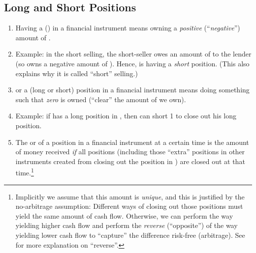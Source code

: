 \subsection{Long and Short Positions}
\label{subsect:long-short-pos}
\begin{enumerate}
\item \label{it:long-short-def}
Having a  () in a financial
instrument  means owning a \emph{positive} (``\emph{negative}'')
amount of .


\item Example: in the short selling, the short-seller  owes an amount of
 to the lender  (so  owns a
negative amount of ). Hence,  is having a
\emph{short} position.  (This also explains why it is called ``short''
selling.)

\item {} or  a (long or short) position in a
financial instrument  means doing something such that
\emph{zero}  is owned (``clear'' the amount of 
we own).

\item Example: if  has a long position in , then
 can short 1  to close out his long position.

\item The  or  of a position in a financial instrument
 at a certain time is the amount of money 
received \emph{if} all positions (including those ``extra'' positions in other
instruments created from closing out the position in ) are
closed out at that time.\footnote{Implicitly we assume that this amount is
\emph{unique}, and this is justified by the no-arbitrage assumption: Different
ways of closing out those positions must yield the same amount of cash flow.
Otherwise, we can perform the way yielding higher cash flow and perform the
\emph{reverse} (``opposite'') of the way yielding lower cash flow to
``capture'' the difference risk-free (arbitrage). See  for more
explanation on ``reverse''.}


\end{enumerate}
